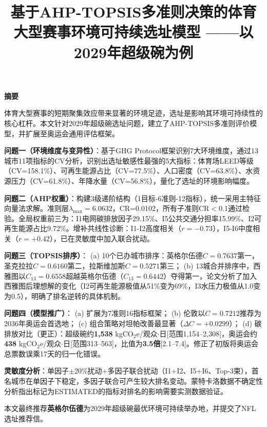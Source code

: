 \documentclass[12pt]{ctexart}
\begin{document}
\title{\textbf{基于AHP-TOPSIS多准则决策的体育大型赛事环境可持续选址模型
——以2029年超级碗为例}}
\author{}
\date{}
\maketitle
\thispagestyle{empty}

\begin{center}\textbf{摘\quad 要}\end{center}
\noindent
体育大型赛事的短期聚集效应带来显著的环境足迹，选址是影响其环境可持续性的核心杠杆。本文针对2029年超级碗选址问题，建立了AHP-TOPSIS多准则评价模型，并扩展至奥运会通用评估框架。

\textbf{问题一（环境维度与变异性）}：基于GHG Protocol框架识别7大环境维度，通过13城市11项指标的CV分析，识别出选址敏感性最强的5大指标：体育场LEED等级（CV=158.1\%）、可再生能源占比（CV=77.5\%）、人口密度（CV=63.8\%）、水资源压力（CV=61.8\%）、年降水量（CV=56.8\%），量化了选址的环境影响幅度。

\textbf{问题二（AHP权重）}：构建3级递阶结构（1目标-6准则-12指标），统一采用主特征向量法求解。准则层$\lambda_{\max}=6.0632$，CR=0.0102，所有子准则CR$<$0.1通过检验。全局权重前三为：I1电网碳排放因子29.15\%、I5公共交通分担率15.99\%、I2可再生能源占比9.72\%。增补共线性诊断：I1-I2高度相关（$r=-0.73$），I5-I6中度相关（$r=+0.42$），已在灵敏度中加入联合扰动。

\textbf{问题三（TOPSIS排序）}：
(a) 10个已办城市排序：英格尔伍德$C=0.7637$第一，圣克拉拉$C=0.6160$第二，拉斯维加斯$C=0.5271$第三；
(b) 13城合并排序中，西雅图以$C_{13}=0.6558$超越英格尔伍德（$C_{13}=0.6442$）夺得第一，论文分析了加入西雅图后理想解的变化（I2可再生能源极值从51\%变为69\%，I3水压力极值从1.0变为0.5），明确了排名逆转的具体机制。

\textbf{问题四（模型推广）}：
(a) 扩展为7准则16指标框架；
(b) 伦敦以$C=0.7212$推荐为2036年奥运会首选地；
(c) 组合策略对坦帕改善最显著（$\Delta C=+0.0299$）；
(d) 碳排放对比（更正）：超级碗约\textbf{1,538} kgCO$_2$e/观众$\cdot$日[范围1,154--2,308]，奥运会约\textbf{438} kgCO$_2$e/观众$\cdot$日[范围313--563]，比值为\textbf{3.5倍}[2.1--7.4]。修正了初版将奥运会总票数误乘17天的归一化错误。

\textbf{灵敏度分析}：单因子$\pm$20\%扰动+多因子联合扰动（I1+I2、I5+I6、Top-3束），首名城市在单因子下稳定，多因子联合可产生较大排名变动。蒙特卡洛数据不确定性分析指出标记为ESTIMATED的指标对排名的影响需要实测数据验证。

本文最终推荐\textbf{英格尔伍德}为2029年超级碗最优环境可持续举办地，并提交了NFL选址推荐信。
\end{document}
